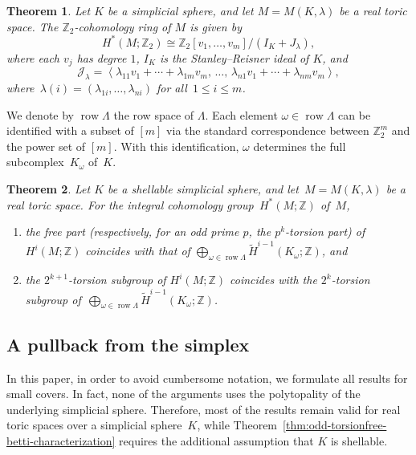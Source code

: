 \documentclass{amsart}
\newcommand{\cJ}{\mathcal{J}}
\newcommand{\Z}{\mathbb{Z}}
\DeclareMathOperator{\row}{row}
\theoremstyle{plain}
\newtheorem{theorem}{Theorem}[section]
\numberwithin{equation}{section}
\theoremstyle{definition}
\theoremstyle{remark}
\begin{document}
\begin{theorem}\cite[Theorem~5.12]{Davis-Januszkiewicz1991}
Let $K$ be a simplicial sphere, and let $M = M(K,\lambda)$ be a real toric space.
The $\Z_2$-cohomology ring of $M$ is given by
$$
    H^\ast(M;\Z_2)\cong \Z_2[v_1,\dots,v_m]/(I_K+J_\lambda),
$$
where each $v_j$ has degree $1$, $I_K$ is the Stanley--Reisner ideal of $K$, and
$$
    \cJ_\lambda = 
    \left\langle
    \lambda_{11}v_1 + \cdots + \lambda_{1m}v_m,\,
    \ldots,\,
    \lambda_{n1}v_1 + \cdots + \lambda_{nm}v_m
    \right\rangle,
$$
where~$\lambda(i) = (\lambda_{1i},\ldots,\lambda_{ni})$ for all~$1 \leq i \leq m$.
\end{theorem}

We denote by $\row \Lambda$ the row space of $\Lambda$. 
Each element $\omega \in \row \Lambda$ can be identified with a subset of $[m]$ via the standard correspondence between $\Z_2^m$ and the power set of $[m]$.
With this identification, $\omega$ determines the full subcomplex~$K_\omega$ of~$K$.

\begin{theorem}\cite[Theorem~1.1]{Cai-Choi2021}\label{CaiChoi}
    Let $K$ be a shellable simplicial sphere, and let~$M = M(K,\lambda)$ be a real toric space.
    For the integral cohomology group~$H^\ast(M;\Z)$ of~$M$,
    \begin{enumerate}
      \item the free part (respectively, for an odd prime $p$, the $p^k$-torsion part) of $H^i(M;\Z)$ coincides with that of $\underset{\omega \in \row\Lambda}{\bigoplus}\widetilde{H}^{i-1}(K_\omega;\Z)$, and
      \item the $2^{k+1}$-torsion subgroup of $H^i(M;\Z)$ coincides with the $2^{k}$-torsion subgroup of~$\underset{\omega \in \row\Lambda}{\bigoplus}\widetilde{H}^{i-1}(K_\omega;\Z)$.
    \end{enumerate}
\end{theorem}

\subsection{A pullback from the simplex}
In this paper, in order to avoid cumbersome notation, we formulate all results for small covers.
In fact, none of the arguments uses the polytopality of the underlying simplicial sphere.
Therefore, most of the results remain valid for real toric spaces over a simplicial sphere~$K$, while Theorem~\ref{thm:odd-torsionfree-betti-characterization} requires the additional assumption that $K$ is shellable.
\end{document}

